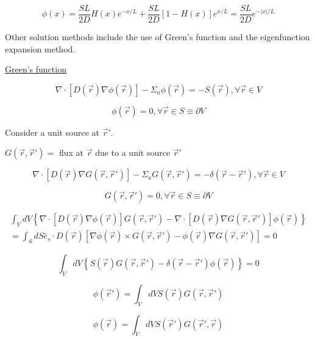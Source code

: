\documentclass[12pt]{article}
\newcommand{\rvec}{\ensuremath{\vec{r}}}
\newcommand{\vecr}{\ensuremath{\vec{r}}}
\begin{document}
\begin{equation*}
\phi(x) = \frac{SL}{2D}H(x)e^{-x/L} + \frac{SL}{2D}[1-H(x)]e^{x/L} = \frac{SL}{2D}e^{-|x|/L}
\end{equation*}


Other solution methods include the use of Green's function and the eigenfunction expansion method.

\underline{Green's function}

\begin{equation*}
\nabla\cdot[D(\rvec)\nabla\phi(\rvec)] - \Sigma_a\phi(\vecr) = -S(\rvec), \forall \vecr \in V
\end{equation*}

\begin{equation*}
\phi(\rvec) = 0, \forall \vecr \in S \equiv \partial V
\end{equation*}

Consider a unit source at $\rvec'$.


$G(\rvec,\rvec') = $ flux at $\rvec$ due to a unit source $\rvec'$

\begin{equation*}
\nabla\cdot[D(\rvec)\nabla G(\rvec,\rvec')] - \Sigma_a G(\rvec,\rvec') = -\delta(\rvec - \rvec'), 
\forall \rvec \in V
\end{equation*}

\begin{equation*}
G(\rvec,\rvec') = 0, \forall \vecr \in S \equiv \partial V
\end{equation*}

\begin{multline*}
\int_V dV \left\{\nabla\cdot[D(\rvec)\nabla\phi(\rvec)]G(\rvec,\rvec') - 
\nabla\cdot[D(\rvec)\nabla G(\rvec,\rvec')]\phi(\rvec)\right\} \\
= \int_S dS \hat{e}_s\cdot D(\rvec)[\nabla\phi(\rvec)\times G(\rvec,\rvec') - 
\phi(\rvec)\nabla G(\rvec,\rvec')] = 0
\end{multline*}

\begin{equation*}
\int_V dV \left\{S(\rvec)G(\rvec,\rvec') - \delta(\rvec-\rvec')\phi(\rvec)\right\} = 0
\end{equation*}

\begin{equation*}
\phi(\rvec') = \int_V dVS(\rvec)G(\rvec,\rvec')
\end{equation*}

\begin{equation*}
\phi(\rvec) = \int_V dVS(\rvec')G(\rvec',\rvec)
\end{equation*}
\end{document}
